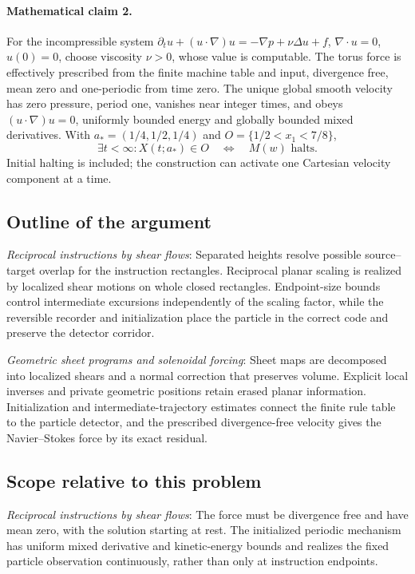 \documentclass[11pt]{article}
\begin{document}
\paragraph{Mathematical claim 2.} For the incompressible system $\partial_tu+(u\cdot\nabla)u=-\nabla p+\nu\Delta u+f$, $\nabla\cdot u=0$, $u(0)=0$, choose viscosity $\nu>0$, whose value is computable. The torus force is effectively prescribed from the finite machine table and input, divergence free, mean zero and one-periodic from time zero. The unique global smooth velocity has zero pressure, period one, vanishes near integer times, and obeys $(u\cdot\nabla)u=0$, uniformly bounded energy and globally bounded mixed derivatives. With $a_*=(1/4,1/2,1/4)$ and $O=\{1/2<x_1<7/8\}$, \[\exists t<\infty:X(t;a_*)\in O\quad\Longleftrightarrow\quad M(w)\text{ halts}.\] Initial halting is included; the construction can activate one Cartesian velocity component at a time.

\subsection{Outline of the argument}
\textit{Reciprocal instructions by shear flows}: Separated heights resolve possible source--target overlap for the instruction rectangles. Reciprocal planar scaling is realized by localized shear motions on whole closed rectangles. Endpoint-size bounds control intermediate excursions independently of the scaling factor, while the reversible recorder and initialization place the particle in the correct code and preserve the detector corridor.

\textit{Geometric sheet programs and solenoidal forcing}: Sheet maps are decomposed into localized shears and a normal correction that preserves volume. Explicit local inverses and private geometric positions retain erased planar information. Initialization and intermediate-trajectory estimates connect the finite rule table to the particle detector, and the prescribed divergence-free velocity gives the Navier--Stokes force by its exact residual.

\subsection{Scope relative to this problem}
\textit{Reciprocal instructions by shear flows}: The force must be divergence free and have mean zero, with the solution starting at rest. The initialized periodic mechanism has uniform mixed derivative and kinetic-energy bounds and realizes the fixed particle observation continuously, rather than only at instruction endpoints.
\end{document}
